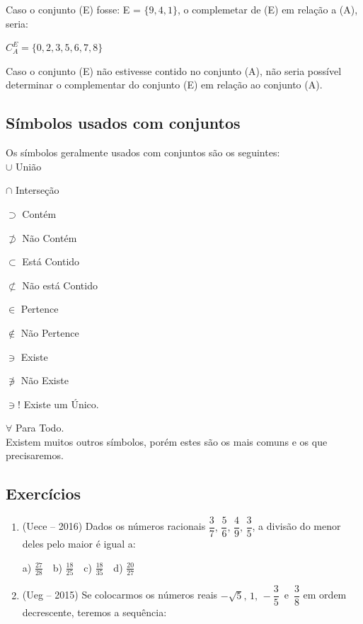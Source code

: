 \begin{multicols*}{2}
    Caso o conjunto (E) fosse: E = $\{9, 4, 1\}$, o complemetar de (E) em relação a (A), seria:

    $ C_A^E = \{ 0, 2, 3, 5, 6, 7, 8\}$

    Caso o conjunto (E) não estivesse contido no conjunto (A), não seria possível determinar o complementar do conjunto (E) em relação ao conjunto (A).

    \subsection{Símbolos usados com conjuntos}

    Os símbolos geralmente usados com conjuntos são os seguintes:\\

    $\cup$ União

    $\cap$ Interseção

    $\supset$ Contém

    $\not \supset$ Não Contém

    $\subset$ Está Contido

    $\not \subset$ Não está Contido

    $\in$ Pertence

    $\not \in$ Não Pertence

    $\ni$ Existe

    $\not \ni$ Não Existe

    $\ni !$ Existe um Único.

    $\forall $ Para Todo.\\

    Existem muitos outros símbolos, porém estes são os mais comuns e os que precisaremos.


    \subsection{Exercícios}

    \begin{enumerate}

        \item (Uece – 2016) Dados os números racionais $ \dfrac{3}{7},\, \dfrac{5}{6},\, \dfrac{4}{9},\, \dfrac{3}{5}$, a divisão do menor deles pelo maior é igual a:

              a) $\frac{27}{28} \ \ \ $ b) $\frac{18}{25} \ \ \ $ c) $\frac{18}{35} \ \ \ $ d) $\frac{20}{27}$

        \item (Ueg – 2015) Se colocarmos os números reais $ - \sqrt{5},\, 1,\, - \dfrac{3}{5}\, $ e $\, \dfrac{3}{8}$ em ordem decrescente, teremos a sequência:


\end{enumerate}
\end{multicols*}
